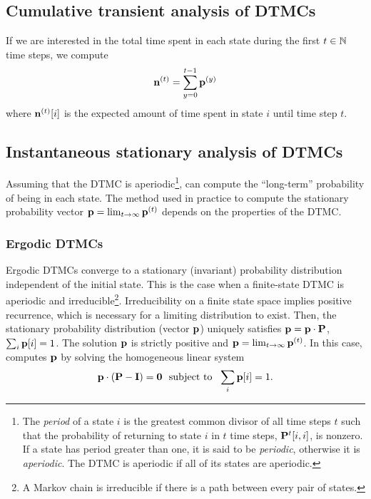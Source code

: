 \subsection{Cumulative transient analysis of DTMCs}
If we are interested in the total time spent in each state during the first
$t \in \Naturals$ time steps, we compute
\[
   \vn^{(t)} = \sum_{y=0}^{t-1} \vp^{(y)}
\]
where $\vn^{(t)}[i]$ is the expected amount of time spent in state $i$
until time step $t$.

\subsection{Instantaneous stationary analysis of DTMCs}
Assuming that the DTMC is aperiodic\footnote{ The \emph{period} of
a state $i$ is the greatest common divisor of all time steps $t$
such that the probability of returning to state $i$ in $t$ time
steps, $\P^t[i,i]$, is nonzero. If a state has period greater than
one, it is said to be \emph{periodic},
otherwise it is \emph{aperiodic}.
The DTMC is aperiodic if all of its states are
aperiodic.}, {\smart} can compute the ``long-term'' probability of
being in each state. The method used in practice to compute the
stationary probability vector
$\vp = \lim_{t \to\infty} \vp^{(t)}$
depends on the properties of the DTMC.

\subsubsection*{Ergodic DTMCs}

Ergodic DTMCs converge to a
stationary (invariant) probability distribution
independent of the initial state.  This is the case when a finite-state DTMC is aperiodic and
irreducible\footnote{ A
Markov chain is irreducible if there is a path between every pair
of states.}.  Irreducibility on a finite state space
implies positive recurrence, which is necessary for a limiting distribution to exist.
Then, the stationary probability distribution (vector
$\vp$) uniquely satisfies $\vp = \vp \cdot \P$,
$\sum_{i}\vp[i]=1$.  The solution $\vp$ is strictly positive and
$\vp = \lim_{t \to\infty} \vp^{(t)}$.  In this case, {\smart} computes
$\vp$ by solving the homogeneous linear system
\[
  \vp \cdot (\P - \I) = \0 \ \text{ subject to }\ \sum_{i}\vp[i]=1.
\]

